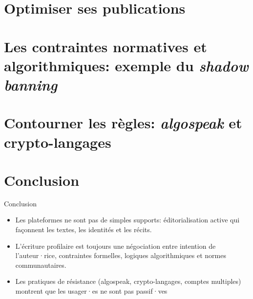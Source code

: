 \documentclass[svgnames,smaller,10pt]{beamer}
\begin{document}
\section{Optimiser ses publications}


\section{Les contraintes normatives et algorithmiques: exemple du \textit{shadow banning}}


\section{Contourner les règles: \textit{algospeak} et crypto-langages}


\section{Conclusion}
\begin{frame}{Conclusion}
    \begin{itemize}
        \item Les plateformes ne sont pas de simples supports: éditorialisation active qui façonnent les textes, les identités et les récits.
        \item L'écriture profilaire est toujours une négociation entre intention de l'auteur·rice, contraintes formelles, logiques algorithmiques et normes communautaires.
        \item Les pratiques de résistance (algospeak, crypto-langages, comptes multiples) montrent que les usager·es ne sont pas passif·ves

    \end{itemize}
  
\end{frame}
\end{document}
